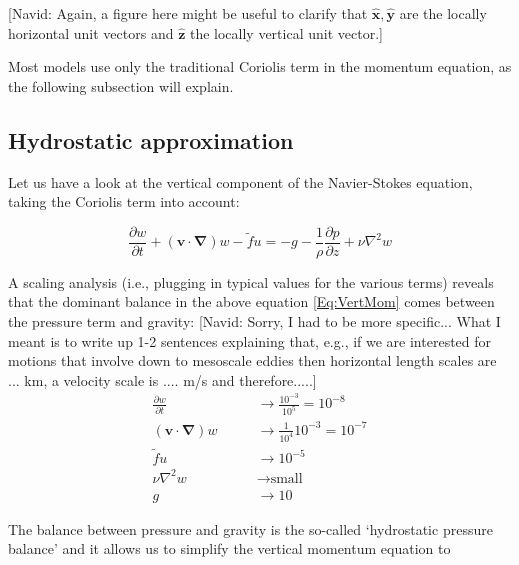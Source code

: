
{\color{red}[Navid: Again, a figure here might be useful to clarify that $\hat{\boldsymbol{x}}, \hat{\boldsymbol{y}}$ are the locally horizontal unit vectors and $\hat{\boldsymbol{z}}$ the locally vertical unit vector.]}

Most models use only the traditional Coriolis term in the momentum equation, as the following subsection will explain.


\subsection{Hydrostatic approximation}
Let us have a look at the vertical component of the Navier-Stokes equation, taking the Coriolis term into account:

\begin{equation}
\frac{\partial w}{\partial t} + (\boldsymbol{v}\cdot \boldsymbol{\nabla})w -\tilde{f}u = -g -\frac{1}{\rho} \frac{\partial p}{\partial z} + \nu \nabla^2w
\label{Eq:VertMom}
\end{equation}

A scaling analysis {\color{red}(i.e., plugging in typical values for the various terms)} reveals that the dominant balance in the above equation \ref{Eq:VertMom} comes between the pressure term and gravity:
{\color{red}[Navid: Sorry, I had to be more specific... What I meant is to write up 1-2 sentences explaining that, e.g., if we are interested for motions that involve down to mesoscale eddies then  horizontal length scales are ... km, a velocity scale is .... m/s and therefore.....]}
\begin{equation}
\begin{aligned}
\frac{\partial w}{\partial t} \qquad &\rightarrow \frac{10^{-3}}{10^5} = 10^{-8}\\
(\boldsymbol{v}\cdot \boldsymbol{\nabla})w \qquad &\rightarrow \frac{1}{10^{4}} 10^{-3} = 10^{-7}\\
\tilde{f}u \qquad &\rightarrow 10^{-5}\\
\nu \nabla^2w \qquad &\rightarrow \text{small} \\
\hline
g \qquad &\rightarrow 10
\end{aligned}
\label{Eq:HydrScale}
\end{equation}

The balance between pressure and gravity is the so-called `hydrostatic pressure balance' and it allows us to simplify the vertical momentum equation to

